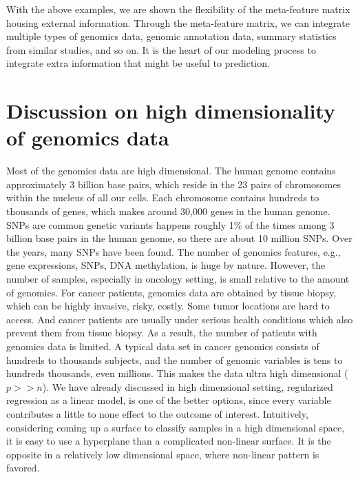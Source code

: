 With the above examples, we are shown the flexibility of the meta-feature matrix housing external information. Through the meta-feature matrix, we can integrate multiple types of genomics data, genomic annotation data, summary statistics from similar studies, and so on. It is the heart of our modeling process to integrate extra information that might be useful to prediction.

\section{Discussion on high dimensionality of genomics data}
Most of the genomics data are high dimensional. The human genome contains approximately 3 billion base pairs, which reside in the 23 pairs of chromosomes within the nucleus of all our cells. Each chromosome contains hundreds to thousands of genes, which makes around 30,000 genes in the human genome. SNPs are common genetic variants happens roughly 1\% of the times among 3 billion base pairs in the human genome, so there are about 10 million SNPs. Over the years, many SNPs have been found. The number of genomics features, e.g., gene expressions, SNPs, DNA methylation, is huge by nature. However, the number of samples, especially in oncology setting, is small relative to the amount of genomics. For cancer patients, genomics data are obtained by tissue biopsy, which can be highly invasive, risky, costly. Some tumor locations are hard to access. And cancer patients are usually under serious health conditions which also prevent them from tissue biopsy. As a result, the number of patients with genomics data is limited. A typical data set in cancer genomics consists of hundreds to thousands subjects, and the number of genomic variables is tens to hundreds thousands, even millions. This makes the data ultra high dimensional ($p>>n$). We have already discussed in high dimensional setting, regularized regression as a linear model, is one of the better options, since every variable contributes a little to none effect to the outcome of interest. Intuitively, considering coming up a surface to classify samples in a high dimensional space, it is easy to use a hyperplane than a complicated non-linear surface. It is the opposite in a relatively low dimensional space, where non-linear pattern is favored. 

